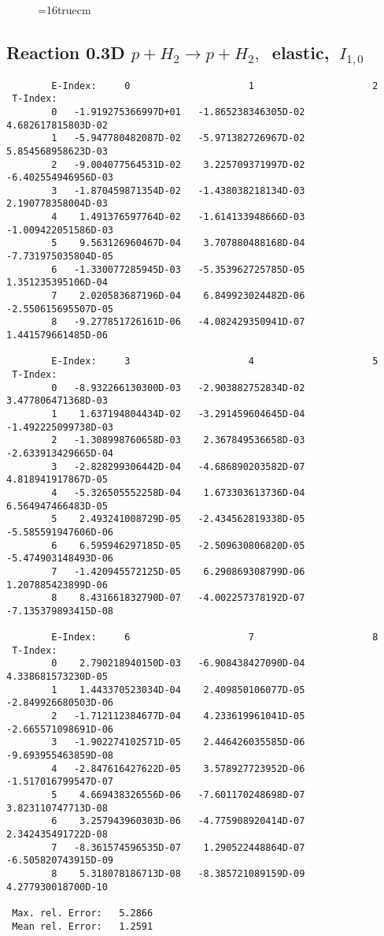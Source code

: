 \documentclass[12pt]{article}
\begin{document}
\begin{figure} \label{0.3T}
\epsfxsize=16truecm
\end{figure}
\newpage


\subsection{
Reaction 0.3D  $p + H_2 \rightarrow  p + H_2 ,\ $  elastic,
$\  I_{1,0}$
}

\begin{small}\begin{verbatim}
        E-Index:     0                     1                     2
 T-Index:
        0   -1.919275366997D+01   -1.865238346305D-02    4.682617815803D-02
        1   -5.947780482087D-02   -5.971382726967D-02    5.854568958623D-03
        2   -9.004077564531D-02    3.225709371997D-02   -6.402554946956D-03
        3   -1.870459871354D-02   -1.438038218134D-03    2.190778358004D-03
        4    1.491376597764D-02   -1.614133948666D-03   -1.009422051586D-03
        5    9.563126960467D-04    3.707880488168D-04   -7.731975035804D-05
        6   -1.330077285945D-03   -5.353962725785D-05    1.351235395106D-04
        7    2.020583687196D-04    6.849923024482D-06   -2.550615695507D-05
        8   -9.277851726161D-06   -4.082429350941D-07    1.441579661485D-06

        E-Index:     3                     4                     5
 T-Index:
        0   -8.932266130300D-03   -2.903882752834D-02    3.477806471368D-03
        1    1.637194804434D-02   -3.291459604645D-04   -1.492225099738D-03
        2   -1.308998760658D-03    2.367849536658D-03   -2.633913429665D-04
        3   -2.828299306442D-04   -4.686890203582D-07    4.818941917867D-05
        4   -5.326505552258D-04    1.673303613736D-04    6.564947466483D-05
        5    2.493241008729D-05   -2.434562819338D-05   -5.585591947606D-06
        6    6.595946297185D-05   -2.509630806820D-05   -5.474903148493D-06
        7   -1.420945572125D-05    6.290869308799D-06    1.207885423899D-06
        8    8.431661832790D-07   -4.002257378192D-07   -7.135379893415D-08

        E-Index:     6                     7                     8
 T-Index:
        0    2.790218940150D-03   -6.908438427090D-04    4.338681573230D-05
        1    1.443370523034D-04    2.409850106077D-05   -2.849926680503D-06
        2   -1.712112384677D-04    4.233619961041D-05   -2.665571098691D-06
        3   -1.902274102571D-05    2.446426035585D-06   -9.693955463859D-08
        4   -2.847616427622D-05    3.578927723952D-06   -1.517016799547D-07
        5    4.669438326556D-06   -7.601170248698D-07    3.823110747713D-08
        6    3.257943960303D-06   -4.775908920414D-07    2.342435491722D-08
        7   -8.361574596535D-07    1.290522448864D-07   -6.505820743915D-09
        8    5.318078186713D-08   -8.385721089159D-09    4.277930018700D-10

 Max. rel. Error:   5.2866
 Mean rel. Error:   1.2591
\end{verbatim}\end{small}
\end{document}
